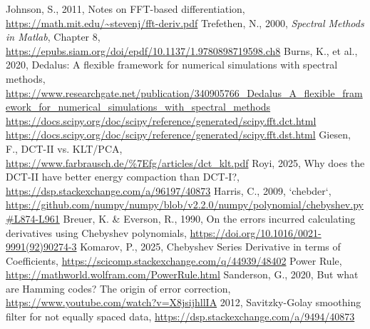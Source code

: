 \documentclass[10pt]{article}
\begin{document}
\begin{thebibliography}{99}
	Johnson, S., 2011, Notes on FFT-based differentiation, \url{https://math.mit.edu/~stevenj/fft-deriv.pdf}
	Trefethen, N., 2000, \textit{Spectral Methods in Matlab}, Chapter 8, \url{https://epubs.siam.org/doi/epdf/10.1137/1.9780898719598.ch8}	
	Burns, K., et al., 2020, Dedalus: A flexible framework for numerical simulations with spectral methods, \url{https://www.researchgate.net/publication/340905766_Dedalus_A_flexible_framework_for_numerical_simulations_with_spectral_methods}
	\url{https://docs.scipy.org/doc/scipy/reference/generated/scipy.fft.dct.html}
	\url{https://docs.scipy.org/doc/scipy/reference/generated/scipy.fft.dst.html}
	Giesen, F., DCT-II vs. KLT/PCA, \url{https://www.farbrausch.de/%7Efg/articles/dct_klt.pdf}
	Royi, 2025, Why does the DCT-II have better energy compaction than DCT-I?, \url{https://dsp.stackexchange.com/a/96197/40873}
	Harris, C., 2009, `chebder`, \url{https://github.com/numpy/numpy/blob/v2.2.0/numpy/polynomial/chebyshev.py#L874-L961}
	Breuer, K. \& Everson, R., 1990, On the errors incurred calculating derivatives using Chebyshev polynomials, \url{https://doi.org/10.1016/0021-9991(92)90274-3}
	Komarov, P., 2025, Chebyshev Series Derivative in terms of Coefficients, \url{https://scicomp.stackexchange.com/q/44939/48402}
	Power Rule, \url{https://mathworld.wolfram.com/PowerRule.html}
	Sanderson, G., 2020, But what are Hamming codes? The origin of error correction, \url{https://www.youtube.com/watch?v=X8jsijhllIA}
	2012, Savitzky-Golay smoothing filter for not equally spaced data, \url{https://dsp.stackexchange.com/a/9494/40873}
\end{thebibliography}
\end{document}
